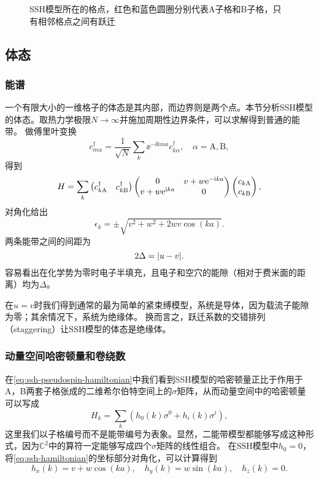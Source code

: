 \begin{figure}
    \centering
    
    \caption{SSH模型所在的格点，红色和蓝色圆圈分别代表A子格和B子格，只有相邻格点之间有跃迁}
\end{figure}

\subsection{体态}

\subsubsection{能谱}

一个有限大小的一维格子的体态是其内部，而边界则是两个点。本节分析SSH模型的体态。取热力学极限$N \to \infty$并施加周期性边界条件，可以求解得到普通的能带。
做傅里叶变换
\begin{equation}
    c_{m \alpha}^\dagger = \frac{1}{\sqrt{N}} \sum_k \ee^{- \ii k m a} c_{k \alpha}^\dagger, \quad \alpha = \text{A}, \text{B},
\end{equation}
得到
\begin{equation}
    H = \sum_k \pmqty{c^\dagger_{k \text{A}} & c^\dagger_{k \text{B}}} \pmqty{ 0 & v + w \ee^{- \ii k a} \\ v + w \ee^{\ii k a} & 0 } \pmqty{ c_{k \text{A}} \\ c_{k \text{B}} },
\end{equation}
对角化给出
\begin{equation}
    \epsilon_{k} = \pm \sqrt{ v^2 + w^2 + 2 wv \cos(ka) }.
    \label{eq:ssh-energy-band}
\end{equation}
两条能带之间的间距为
\begin{equation}
    2 \Delta = \abs{u - v}.
\end{equation}
容易看出在化学势为零时电子半填充，且电子和空穴的能隙（相对于费米面的距离）均为$\Delta$。

在$u=v$时我们得到通常的最为简单的紧束缚模型，系统是导体，因为载流子能隙为零；其余情况下，系统为绝缘体。
换而言之，跃迁系数的交错排列（staggering）让SSH模型的体态是绝缘体。

\subsubsection{动量空间哈密顿量和卷绕数}

在\eqref{eq:ssh-pseudospin-hamiltonian}中我们看到SSH模型的哈密顿量正比于作用于A，B两套子格张成的二维希尔伯特空间上的$\sigma$矩阵，从而动量空间中的哈密顿量可以写成
\begin{equation}
    H_k = \sum_{k} (h_0(k) \sigma^0 + h_i(k) \sigma^i),
\end{equation}
这里我们以子格编号而不是能带编号为表象。显然，二能带模型都能够写成这种形式，因为$\mathbb{C}^2$中的算符一定能够写成四个$\sigma$矩阵的线性组合。
在SSH模型中$h_0 = 0$，将\eqref{eq:ssh-hamiltonian}的坐标部分对角化，可以计算得到
\begin{equation}
    h_x(k) = v + w \cos(ka), \quad h_y(k) = w \sin(ka), \quad h_z(k) = 0.
    \label{eq:ssh-band-curve}
\end{equation}

